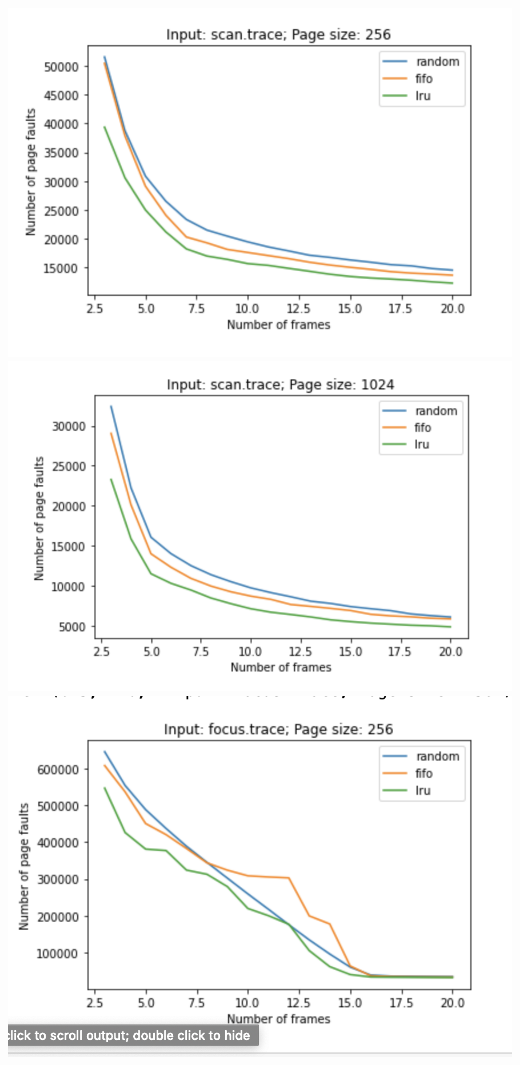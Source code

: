 \documentclass[a4paper, 11pt]{article}
\begin{document}
\includegraphics[width=\textwidth]{scanTrace256.png}\\
\includegraphics[width=\textwidth]{scanTrace1024.png}\\
\includegraphics[width=\textwidth]{focusTrace256.png}\\
\end{document}
